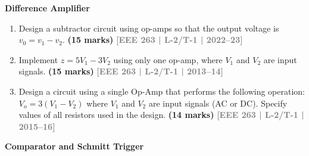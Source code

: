 \documentclass[12pt,a4paper]{article}
\newcommand{\yr}[1]{\hfill\textcolor{gray}{\small\textbf{[#1]}}}
\newcommand{\mk}[1]{\textcolor{orange!70!black}{\small\textbf{(#1 marks)}}}
\newcommand{\subtopic}[2]{%
  \vspace{10pt}
  \noindent\begin{tcolorbox}[colback=#1!8,colframe=#1,boxrule=0.6pt,arc=4pt,
    left=6pt,right=6pt,top=4pt,bottom=4pt]
    \small\bfseries\textcolor{#1}{#2}
  \end{tcolorbox}
  \vspace{2pt}
}
\begin{document}
\subtopic{cE}{Difference Amplifier}
\label{sub:s7-diff}

\begin{enumerate}

\item Design a subtractor circuit using op-amps so that the output voltage is $v_0 = v_1 - v_2$.
\mk{15} \yr{EEE 263 | L-2/T-1 | 2022--23}

\item Implement $z = 5V_1 - 3V_2$ using only one op-amp, where $V_1$ and $V_2$ are input signals.
\mk{15} \yr{EEE 263 | L-2/T-1 | 2013--14}

\item Design a circuit using a single Op-Amp that performs the following operation: $V_o = 3(V_1 - V_2)$ where $V_1$ and $V_2$ are input signals (AC or DC). Specify values of all resistors used in the design.
\mk{14} \yr{EEE 263 | L-2/T-1 | 2015--16}

\end{enumerate}

\subtopic{cE}{Comparator and Schmitt Trigger}
\label{sub:s7-schmitt}
\end{document}
